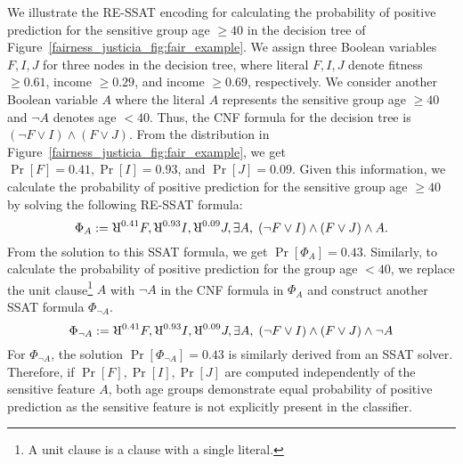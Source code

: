 \begin{example}
	\label{fairness_justicia_example:re_ssat}
	We illustrate the RE-SSAT encoding for calculating the probability of positive prediction for the sensitive group age $ \ge 40 $ in the decision tree of Figure~\ref{fairness_justicia_fig:fair_example}. We assign three Boolean variables $ F,I,J $ for three nodes in the decision tree, where literal $ F,I,J $ denote fitness $ \ge 0.61 $, income $ \ge 0.29 $, and income $ \ge 0.69 $, respectively. We consider another Boolean variable $A$  where the literal $ A $ represents the sensitive group age $ \ge 40 $ and $ \neg A $ denotes age $ < 40 $. Thus, the CNF formula  for the decision tree is $ (\neg F \vee I) \wedge (F \vee J) $. From the distribution in Figure~\ref{fairness_justicia_fig:fair_example}, we get $ \Pr[F] = 0.41, \Pr[I] = 0.93 $, and $ \Pr[J] = 0.09 $. Given this information, we calculate the probability of positive prediction for the sensitive group age $ \ge 40 $ by solving the following RE-SSAT formula:
	\begin{equation}
	\Phi_A := \R^{0.41}F, \R^{0.93}I, \R^{0.09}J, \exists A, \; (\neg F \vee I) \wedge (F \vee J) \wedge A.\notag
	\end{equation}
	From the solution to this SSAT formula, we get $ \Pr[\Phi_A] = 0.43 $. Similarly, to calculate the probability of positive prediction for the group age $ < 40 $, we replace the unit clause\footnote{A unit clause is a clause with a single literal.} $ A $ with $ \neg A $ in the CNF formula in $ \Phi_A $ and construct another SSAT formula $ \Phi_{\neg A} $. 
	\[ \Phi_{\neg A} := \R^{0.41}F, \R^{0.93}I, \R^{0.09}J, \exists A, \; (\neg F \vee I) \wedge (F \vee J) \wedge \neg A \]
	For $ \Phi_{\neg A} $, the solution $ \Pr[\Phi_{\neg A}] = 0.43 $ is similarly derived from an SSAT solver. 
	Therefore, if $\Pr[F], \Pr[I], \Pr[J]$ are computed independently of the sensitive feature $A$, both age groups demonstrate equal probability of positive prediction as the sensitive feature is not explicitly present in the classifier. 


\end{example}
